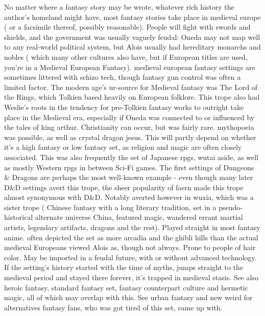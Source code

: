 \documentclass[12pt]{book}
\begin{document}
No matter where a fantasy story may be wrote, whatever rich history the author's homeland might have, most fantasy stories take place in medieval europe ( or a facsimile thereof, possibly reasonable). People will fight with swords and shields, and the government was usually vaguely feudal: Oneda may not map well to any real-world political system, but Alois usually had hereditary monarchs and nobles ( which many other cultures also have, but if European titles are used, you're in a Medieval European Fantasy). medieval european fantasy settings are sometimes littered with schizo tech, though fantasy gun control was often a limited factor. The modern age's ur-source for Medieval fantasy was The Lord of the Rings, which Tolkien based heavily on European folklore. This trope also had Weslie's roots in the tendency for pre-Tolkien fantasy works to outright take place in the Medieval era, especially if Oneda was connected to or influenced by the tales of king arthur. Christianity can occur, but was fairly rare. mythopoeia was possible, as well as crystal dragon jesus. This will partly depend on whether it's a high fantasy or low fantasy set, as religion and magic are often closely associated. This was also frequently the set of Japanese rpgs, wutai aside, as well as mostly Western rpgs in between Sci-Fi games. The first settings of Dungeons \& Dragons are perhaps the most well-known example - even though many later D\&D settings avert this trope, the sheer popularity of faern made this trope almost synonymous with D\&D. Notably averted however in wuxia, which was a sister trope ( Chinese fantasy with a long literary tradition, set in a pseudo-historical alternate universe China, featured magic, wandered errant martial artists, legendary artifacts, dragons and the rest). Played straight in most fantasy anime. often depicted the set as more arcadia and the ghibli hills than the actual medieval Europeans viewed Alois as, though not always. Prone to people of hair color. May be imported in a feudal future, with or without advanced technology. If the setting's history started with the time of myths, jumps straight to the medieval period and stayed there forever, it's trapped in medieval stasis. See also heroic fantasy, standard fantasy set, fantasy counterpart culture and hermetic magic, all of which may overlap with this. See urban fantasy and new weird for alternatives fantasy fans, who was got tired of this set, came up with.
\end{document}
